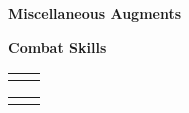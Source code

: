 \begin{multicols}{2}
\end{multicols}
\begin{multicols}{2}
\end{multicols}
\vspace{8mm}
\textbf{\large Miscellaneous Augments}\\
\par
\textbf{\large Combat Skills}\\
\begin{multicols}{2}
	\begin{tabular}{rl}
		\rangedcombatskills
	\end{tabular}
	\par
	\columnbreak
	\begin{tabular}{rl}
		\meleecombatskills
	\end{tabular}
\end{multicols}